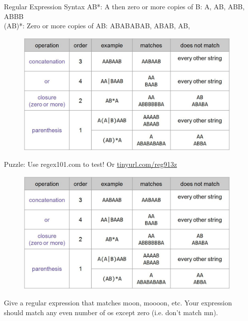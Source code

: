 \documentclass[aspectratio=169]{../latex_main/tntbeamer}  %
\begin{document}
	
	
	\begin{frame}{Regular Expression Syntax}
	   AB*: A then zero or more copies of B: A, AB, ABB, ABBB\\
       (AB)*: Zero or more copies of AB: ABABABAB,  ABAB, AB,  

        \begin{figure}
	        \centering
	        \includegraphics[scale=.35]{Bild10}
	    \end{figure}
	\end{frame}
	
	
	
	\begin{frame}{Puzzle: Use regex101.com to test! Or \url{tinyurl.com/reg913z}}
 

        \begin{figure}
	        \centering
	        \includegraphics[scale=.35]{Bild10}
	    \end{figure}
	    Give a regular expression that matches moon, moooon, etc. Your expression should match any even number of os except zero (i.e. don’t match mn).

	\end{frame}
	
\end{document}
